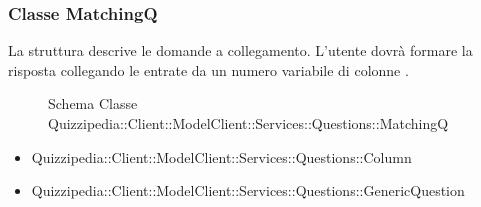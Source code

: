 \subsubsection{Classe MatchingQ}
La struttura descrive le domande a collegamento. L'utente dovrà formare la risposta collegando le entrate da un numero variabile di colonne .
\begin{figure}[H]
\centering
\noindent{}
\caption[Schema Classe MatchingQ]{Schema Classe Quizzipedia::Client::ModelClient::Services::Questions::MatchingQ}
\end{figure}
\begin{itemize}
\item Quizzipedia::Client::ModelClient::Services::Questions::Column
\item Quizzipedia::Client::ModelClient::Services::Questions::GenericQuestion
\end{itemize}
